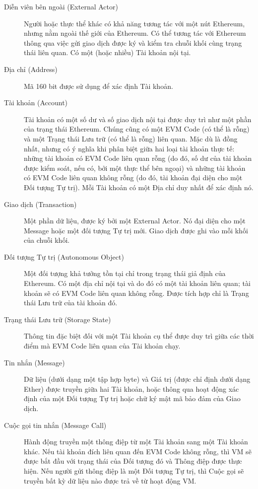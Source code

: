 \documentclass[9pt,oneside]{amsart}
\begin{document}
\begin{description}
\item[Diễn viên bên ngoài (External Actor)] Người hoặc thực thể khác có khả năng tương tác với một nút Ethereum, nhưng nằm ngoài thế giới của Ethereum. Có thể tương tác với Ethereum thông qua việc gửi giao dịch được ký và kiểm tra chuỗi khối cùng trạng thái liên quan. Có một (hoặc nhiều) Tài khoản nội tại.

\item[Địa chỉ (Address)] Mã 160 bit được sử dụng để xác định Tài khoản.

\item[Tài khoản (Account)] Tài khoản có một số dư và số giao dịch nội tại được duy trì như một phần của trạng thái Ethereum. Chúng cũng có một EVM Code (có thể là rỗng) và một Trạng thái Lưu trữ (có thể là rỗng) liên quan. Mặc dù là đồng nhất, nhưng có ý nghĩa khi phân biệt giữa hai loại tài khoản thực tế: những tài khoản có EVM Code liên quan rỗng (do đó, số dư của tài khoản được kiểm soát, nếu có, bởi một thực thể bên ngoại) và những tài khoản có EVM Code liên quan không rỗng (do đó, tài khoản đại diện cho một Đối tượng Tự trị). Mỗi Tài khoản có một Địa chỉ duy nhất để xác định nó.

\item[Giao dịch (Transaction)] Một phần dữ liệu, được ký bởi một External Actor. Nó đại diện cho một Message hoặc một đối tượng Tự trị mới. Giao dịch được ghi vào mỗi khối của chuỗi khối.

\item[Đối tượng Tự trị (Autonomous Object)] Một đối tượng khả tưởng tồn tại chỉ trong trạng thái giả định của Ethereum. Có một địa chỉ nội tại và do đó có một tài khoản liên quan; tài khoản sẽ có EVM Code liên quan không rỗng. Được tích hợp chỉ là Trạng thái Lưu trữ của tài khoản đó.

\item[Trạng thái Lưu trữ (Storage State)] Thông tin đặc biệt đối với một Tài khoản cụ thể được duy trì giữa các thời điểm mà EVM Code liên quan của Tài khoản chạy.

\item[Tin nhắn (Message)] Dữ liệu (dưới dạng một tập hợp byte) và Giá trị (được chỉ định dưới dạng Ether) được truyền giữa hai Tài khoản, hoặc thông qua hoạt động xác định của một Đối tượng Tự trị hoặc chữ ký mật mã bảo đảm của Giao dịch.

\item[Cuộc gọi tin nhắn (Message Call)] Hành động truyền một thông điệp từ một Tài khoản sang một Tài khoản khác. Nếu tài khoản đích liên quan đến EVM Code không rỗng, thì VM sẽ được bắt đầu với trạng thái của Đối tượng đó và Thông điệp được thực hiện. Nếu người gửi thông điệp là một Đối tượng Tự trị, thì Cuộc gọi sẽ truyền bất kỳ dữ liệu nào được trả về từ hoạt động VM.


\end{description}
\end{document}

